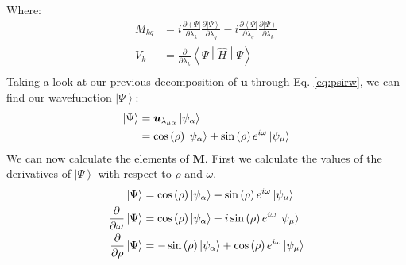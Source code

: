 \documentclass{aux/ttuthes2007}
\newcommand{\bra}[1]{\ensuremath{\left\langle#1\right\vert}}
\newcommand{\ket}[1]{\ensuremath{\left|#1\right\rangle}}
\newcommand{\sandwich}[3]{\left< #1 \middle\vert #2 \middle\vert #3 \right>}
\newcommand{\s}[1]{\sin\left( #1 \right)}
\newcommand{\co}[1]{\cos\left( #1 \right)}
\newcommand{\pd}[1]{\frac{\partial}{\partial #1}}
\newcommand{\kpp}[1]{\frac{\partial \ket\Psi}{\partial #1}}
\newcommand{\bpp}[1]{\frac{\partial \bra\Psi}{\partial #1}}
\newcommand{\ind}[1]{{\uo #1 \oo #1}}
\newcommand{\uo}[1]{
		\IfEqCase{#1}{
			{0}{\mu}
			{1}{\nu}
			{2}{\xi}
		}[\PackageError{uo}{Undefined option to uo: #1}{}]
}
\newcommand{\oo}[1]{
		\IfEqCase{#1}{
			{0}{\alpha}
			{1}{\beta}
			{2}{\gamma}
		}[\PackageError{unocorb}{Undefined option to unuo: #1}{}]
}
\begin{document}
%
Where:
\begin{equation*}
	\begin{split}
	M_{kq} 
	&= 
	 	i \bpp{\lambda_k} \kpp{\lambda_q} - i \bpp{\lambda_q} \kpp{\lambda_k} 
	\\
	V_k 
	&= 	\pd{\lambda_k}\sandwich{\Psi}{\hat H}{\Psi} \\
	\end{split}
\end{equation*}
%
Taking a look at our previous decomposition of $\bm u$ through Eq. \ref{eq:psirw}, we can find our wavefunction $\ket\Psi$:
%
\begin{equation*}
	\begin{split}
	\ket \Psi 
	&= \bm u_{\lambda_\ind 0} \ket {\psi_{\oo 0}} \\
	&= \co {\rho} \ket {\psi_{\oo 0}} + \s {\rho}e^{i\omega} \ket{\psi_{\uo 0}} \\
	\end{split}
\end{equation*}
%
We can now calculate the elements of $\bm M$. First we calculate the values of the derivatives of $\ket \Psi$ with respect to $\rho$ and $\omega$.
%
\begin{equation*}
	\begin{split}
		\ket{\Psi} 
		&= \co{\rho}\ket{\psi_{\oo {0}}} + \s\rho e^{i\omega}\ket{\psi_{\uo {0}}} 
		\\
		\pd\omega\ket\Psi 
		&= \co\rho\ket{\psi_{\oo {0}}} + i\s\rho e^{i\omega}\ket{\psi_{\uo {0}}} 
		\\
		\pd\rho\ket\Psi 
		&= -\s\rho\ket{\psi_{\oo {0}}} + \co\rho e^{i\omega}\ket{\psi_{\uo {0}}} 
	\end{split}
\end{equation*}
\end{document}
